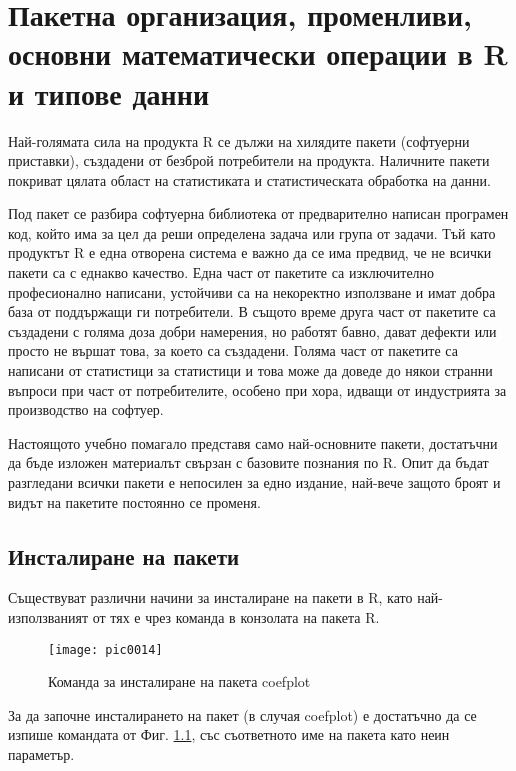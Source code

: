 \newpage
\chapter{Пакетна организация, променливи, основни математически операции в R и типове данни}
\label{chapter02}
\thispagestyle{empty}

Най-голямата сила на продукта R се дължи на хилядите пакети (софтуерни приставки), създадени от безброй потребители на продукта. Наличните пакети покриват цялата област на статистиката и статистическата обработка на данни. 

Под пакет се разбира софтуерна библиотека от предварително написан програмен код, който има за цел да реши определена задача или група от задачи. Тъй като продуктът R е една отворена система е важно да се има предвид, че не всички пакети са с еднакво качество. Една част от пакетите са изключително професионално написани, устойчиви са на некоректно използване и имат добра база от поддържащи ги потребители. В същото време друга част от пакетите са създадени с голяма доза добри намерения, но работят бавно, дават дефекти или просто не вършат това, за което са създадени. Голяма част от пакетите са написани от статистици за статистици и това може да доведе до някои странни въпроси при част от потребителите, особено при хора, идващи от индустрията за производство на софтуер.

Настоящото учебно помагало представя само най-основните пакети, достатъчни да бъде изложен материалът свързан с базовите познания по R. Опит да бъдат разгледани всички пакети е непосилен за едно издание, най-вече защото броят и видът на пакетите постоянно се променя.

\section{Инсталиране на пакети}

Съществуват различни начини за инсталиране на пакети в R, като най-използваният от тях е чрез команда в конзолата на пакета R.

\begin{figure}[h!]
  \centering
  \texttt{[image: pic0014]}
  \caption{Команда за инсталиране на пакета coefplot}
\label{figure0014}
\end{figure}
\FloatBarrier

За да започне инсталирането на пакет (в случая coefplot) е достатъчно да се изпише командата от Фиг. \ref{figure0014}, със съответното име на пакета като неин параметър.


